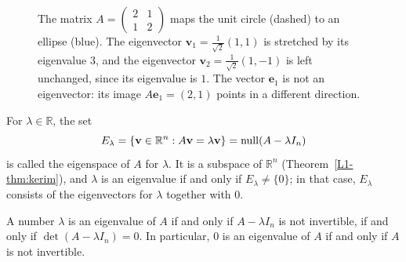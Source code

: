\begin{figure}[ht]
    \centering
    \caption[Eigenvectors]{The matrix $A = \begin{pmatrix} 2 & 1 \\ 1 & 2 \end{pmatrix}$ maps the unit circle (dashed) to an ellipse (blue). The eigenvector $\mathbf{v}_1 = \frac{1}{\sqrt{2}}(1, 1)$ is stretched by its eigenvalue $3$, and the eigenvector $\mathbf{v}_2 = \frac{1}{\sqrt{2}}(1, -1)$ is left unchanged, since its eigenvalue is $1$. The vector $\mathbf{e}_1$ is not an eigenvector: its image $A\mathbf{e}_1 = (2, 1)$ points in a different direction.}
    \label{L1-fig:eigen}
\end{figure}

\begin{definition}[Eigenspace]
    For $\lambda \in \mathbb{R}$, the set
    \[E_\lambda = \{\mathbf{v} \in \mathbb{R}^n : A\mathbf{v} = \lambda \mathbf{v}\} = \operatorname{null}(A - \lambda I_n)\]
    is called the eigenspace of $A$ for $\lambda$. It is a subspace of $\mathbb{R}^n$ (Theorem~\ref{L1-thm:kerim}), and $\lambda$ is an eigenvalue if and only if $E_\lambda \neq \{0\}$; in that case, $E_\lambda$ consists of the eigenvectors for $\lambda$ together with $0$.
\end{definition}

\begin{proposition}\label{L1-prop:eigen-det}
    A number $\lambda$ is an eigenvalue of $A$ if and only if $A - \lambda I_n$ is not invertible, if and only if $\det(A - \lambda I_n) = 0$. In particular, $0$ is an eigenvalue of $A$ if and only if $A$ is not invertible.
\end{proposition}

